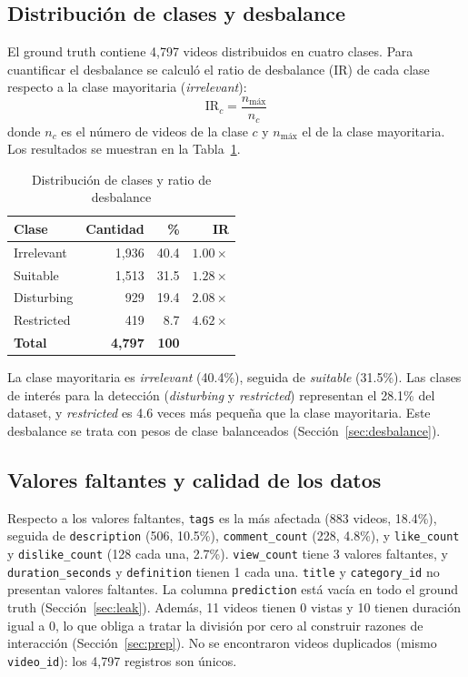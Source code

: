 \documentclass[conference]{IEEEtran}
\begin{document}
\subsection{Distribución de clases y desbalance}\label{sec:clases}
El ground truth contiene 4,797 videos distribuidos en cuatro clases. Para cuantificar el desbalance se calculó el ratio de desbalance (IR) de cada clase respecto a la clase mayoritaria (\textit{irrelevant}):
\begin{equation}
\mathrm{IR}_c=\frac{n_{\text{máx}}}{n_c}\label{eq:ir}
\end{equation}
donde $n_c$ es el número de videos de la clase $c$ y $n_{\text{máx}}$ el de la clase mayoritaria. Los resultados se muestran en la Tabla~\ref{tab:clases}.

\begin{table}[!t]
\caption{Distribución de clases y ratio de desbalance}
\begin{center}
\begin{tabular}{|l|r|r|r|}
\hline
\textbf{Clase} & \textbf{Cantidad} & \textbf{\%} & \textbf{IR} \\
\hline
Irrelevant & 1,936 & 40.4 & $1.00\times$ \\
\hline
Suitable & 1,513 & 31.5 & $1.28\times$ \\
\hline
Disturbing & 929 & 19.4 & $2.08\times$ \\
\hline
Restricted & 419 & 8.7 & $4.62\times$ \\
\hline
\textbf{Total} & \textbf{4,797} & \textbf{100} & \\
\hline
\end{tabular}
\label{tab:clases}
\end{center}
\end{table}

La clase mayoritaria es \textit{irrelevant} (40.4\%), seguida de \textit{suitable} (31.5\%). Las clases de interés para la detección (\textit{disturbing} y \textit{restricted}) representan el 28.1\% del dataset, y \textit{restricted} es 4.6 veces más pequeña que la clase mayoritaria. Este desbalance se trata con pesos de clase balanceados (Sección~\ref{sec:desbalance}).

\subsection{Valores faltantes y calidad de los datos}\label{sec:faltantes}
Respecto a los valores faltantes, \texttt{tags} es la más afectada (883 videos, 18.4\%), seguida de \texttt{description} (506, 10.5\%), \texttt{comment\_count} (228, 4.8\%), y \texttt{like\_count} y \texttt{dislike\_count} (128 cada una, 2.7\%). \texttt{view\_count} tiene 3 valores faltantes, y \texttt{duration\_seconds} y \texttt{definition} tienen 1 cada una. \texttt{title} y \texttt{category\_id} no presentan valores faltantes. La columna \texttt{prediction} está vacía en todo el ground truth (Sección~\ref{sec:leak}). Además, 11 videos tienen 0 vistas y 10 tienen duración igual a 0, lo que obliga a tratar la división por cero al construir razones de interacción (Sección~\ref{sec:prep}). No se encontraron videos duplicados (mismo \texttt{video\_id}): los 4,797 registros son únicos.
\end{document}
